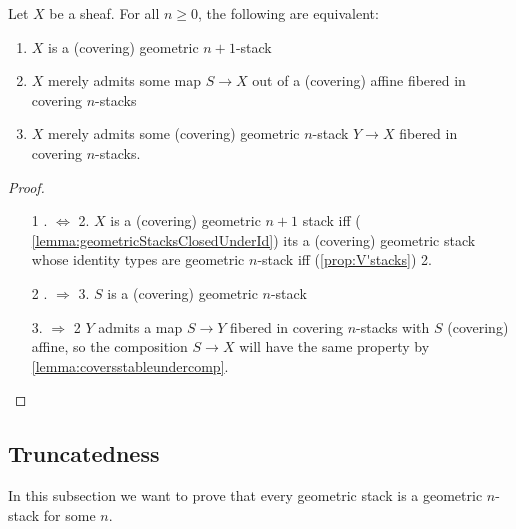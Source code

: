 \begin{prop}
	Let $X$ be a sheaf. For all $n \ge 0$, the following are equivalent:
	\begin{enumerate}
		\item $X$ is a (covering) geometric $n+1$-stack
		\item $X$ merely admits some map $S \to X$ out of a (covering) affine fibered in covering $n$-stacks
		\item $X$ merely admits some (covering) geometric $n$-stack $Y \to X$ fibered in covering $n$-stacks.
	\end{enumerate}
\end{prop}
\begin{proof}
	\
	\begin{enumerate}
		\item[1 . $\Leftrightarrow$ 2.]
		$X$ is a (covering) geometric $n+1$ stack iff ( \ref{lemma:geometricStacksClosedUnderId}) its a (covering) geometric stack whose identity types are geometric $n$-stack iff (\ref{prop:V'stacks}) 2. 
		\item[2 . $\Rightarrow$ 3.]
		$S$ is a (covering) geometric $n$-stack
		\item [3. $\Rightarrow$ 2]
		$Y$ admits a map $S \to Y$  fibered in covering $n$-stacks with $S$ (covering) affine, so the composition $S \to X$ will have the same property by \ref{lemma:coversstableundercomp}.
	\end{enumerate}
\end{proof}
\subsection{Truncatedness}
In this subsection we want to prove that every geometric stack is a geometric $n$-stack for some $n$.


